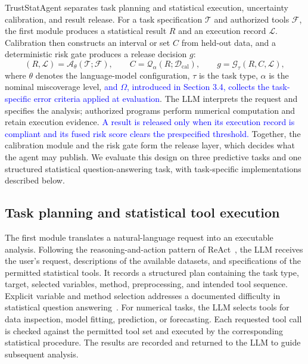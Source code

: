 \documentclass[preprint,12pt,authoryear]{elsarticle}
\begin{document}
TrustStatAgent separates task planning and statistical execution, uncertainty calibration, and result release. For a task specification $\mathcal{T}$ and authorized tools $\mathcal{F}$, the first module produces a statistical result $R$ and an execution record $\mathcal{L}$. Calibration then constructs an interval or set $C$ from held-out data, and a deterministic risk gate produces a release decision $g$:
\begin{equation}
    (R,\mathcal{L})=\mathcal{A}_{\theta}(\mathcal{T};\mathcal{F}),\qquad
    C=\mathcal{Q}_{\alpha}(R;\mathcal{D}_{\mathrm{cal}}),\qquad
    g=\mathcal{G}_{\tau}(R,C,\mathcal{L}),
    \label{eq:framework}
\end{equation}
where $\theta$ denotes the language-model configuration, $\tau$ is the task type, $\alpha$ is the nominal miscoverage level, \textcolor{blue}{and $\Omega$, introduced in Section 3.4, collects the task-specific error criteria applied at evaluation}. The LLM interprets the request and specifies the analysis; authorized programs perform numerical computation and retain execution evidence. \textcolor{blue}{A result is released only when its execution record is compliant and its fused risk score clears the prespecified threshold.} Together, the calibration module and the risk gate form the release layer, which decides what the agent may publish. We evaluate this design on three predictive tasks and one structured statistical question-answering task, with task-specific implementations described below.

\subsection{Task planning and statistical tool execution}
\label{sec:execution}

The first module translates a natural-language request into an executable analysis. Following the reasoning-and-action pattern of ReAct~\citep{yao2023react}, the LLM receives the user's request, descriptions of the available datasets, and specifications of the permitted statistical tools. It records a structured plan containing the task type, target, selected variables, method, preprocessing, and intended tool sequence. Explicit variable and method selection addresses a documented difficulty in statistical question answering~\citep{zhu2024large}. For numerical tasks, the LLM selects tools for data inspection, model fitting, prediction, or forecasting. Each requested tool call is checked against the permitted tool set and executed by the corresponding statistical procedure. The results are recorded and returned to the LLM to guide subsequent analysis.
\end{document}
